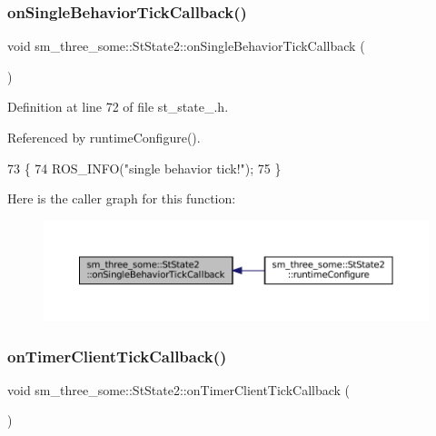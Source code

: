 \subsubsection{\texorpdfstring{on\+Single\+Behavior\+Tick\+Callback()}{onSingleBehaviorTickCallback()}}
{\footnotesize\ttfamily void sm\+\_\+three\+\_\+some\+::\+St\+State2\+::on\+Single\+Behavior\+Tick\+Callback (\begin{DoxyParamCaption}{ }\end{DoxyParamCaption})\hspace{0.3cm}{\ttfamily [inline]}}



Definition at line 72 of file st\+\_\+state\+\_.\+h.



Referenced by runtime\+Configure().


\begin{DoxyCode}
73     \{
74         ROS\_INFO(\textcolor{stringliteral}{"single behavior tick!"});
75     \}
\end{DoxyCode}
Here is the caller graph for this function\+:
\nopagebreak
\begin{figure}[H]
\begin{center}
\leavevmode
\includegraphics[width=350pt]{structsm__three__some_1_1StState2_ac24b22f90d939c7207ca75e82344a5ef_icgraph}
\end{center}
\end{figure}
\mbox{\label{structsm__three__some_1_1StState2_a489156949b0f8f08fc7e32850154ded8}} 
\subsubsection{\texorpdfstring{on\+Timer\+Client\+Tick\+Callback()}{onTimerClientTickCallback()}}
{\footnotesize\ttfamily void sm\+\_\+three\+\_\+some\+::\+St\+State2\+::on\+Timer\+Client\+Tick\+Callback (\begin{DoxyParamCaption}{ }\end{DoxyParamCaption})\hspace{0.3cm}{\ttfamily [inline]}}



